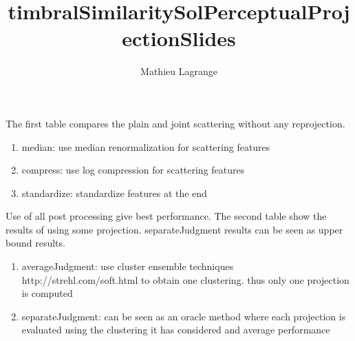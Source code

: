\documentclass{beamer}
\title{timbralSimilaritySolPerceptualProjectionSlides}
\author{ Mathieu Lagrange }
\begin{document}
 
  
\maketitle 
  
  
The first table compares the plain and joint scattering without any reprojection.
\begin{enumerate}
\item median: use median renormalization for scattering features
\item compress: use log compression for scattering features
\item standardize: standardize features at the end
\end{enumerate}
Use of all post processing give best performance. The second table show the results of using some projection. separateJudgment results can be seen as upper bound results.

\begin{enumerate}
\item averageJudgment: use cluster ensemble techniques http://strehl.com/soft.html to obtain one clustering. thus only one projection is computed
\item separateJudgment: can be seen as an oracle method where each projection is evaluated using the clustering it has considered and average performance
\end{enumerate}



 
 
  
\end{document}
